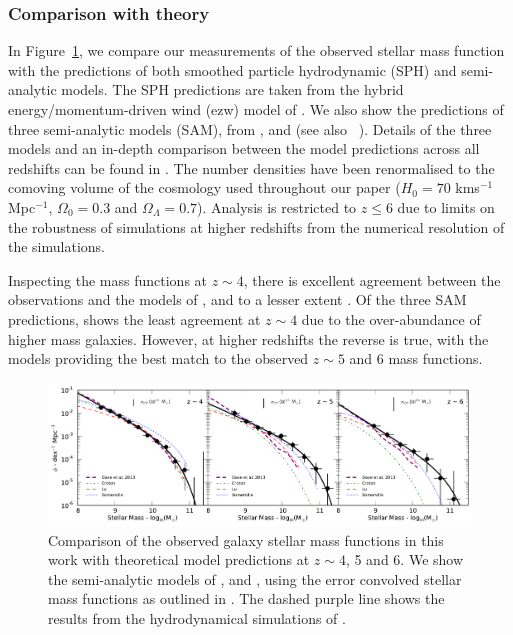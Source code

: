 \subsubsection{Comparison with theory}\label{sec:theory}
In Figure~\ref{fig:smf_theory}, we compare our measurements of the observed stellar mass function with the predictions of both smoothed particle hydrodynamic (SPH) and semi-analytic models. The SPH predictions are taken from the hybrid energy/momentum-driven wind (ezw) model of \citet{Dave:2013bf}. We also show the predictions of three semi-analytic models (SAM), from \citet{Croton:2006ew}, \citet{Lu:2011hj} and \citet{Somerville:2008ed} (see also \citeauthor{Somerville:2012cq}~\citeyear{Somerville:2012cq}). Details of the three models and an in-depth comparison between the model predictions across all redshifts can be found in \citet{Lu:2013ui}. The number densities have been renormalised to the comoving volume of the cosmology used throughout our paper ($H_{0} = 70$ kms$^{-1}$Mpc$^{-1}$, $\Omega_{0}=0.3$ and $\Omega_{\Lambda}=0.7$). Analysis is restricted to $z \leq 6$ due to limits on the robustness of simulations at higher redshifts from the numerical resolution of the simulations.

Inspecting the mass functions at $z \sim 4$, there is excellent agreement between the observations and the models of \citet{Dave:2013bf}, \citet{Croton:2006ew} and to a lesser extent \citet{Lu:2011hj}. Of the three SAM predictions, \citet{Somerville:2008ed} shows the least agreement at $z\sim 4$ due to the over-abundance of higher mass galaxies. However, at higher redshifts the reverse is true, with the \citet{Somerville:2008ed} models providing the best match to the observed $z\sim5$ and 6 mass functions.

\begin{figure}
\centering
\includegraphics[width=\textwidth]{plots/fig11.pdf}
\caption[Short caption]{Comparison of the observed galaxy stellar mass functions in this work with theoretical model predictions at $z \sim 4$, 5 and 6. We show the semi-analytic models of \citet{Croton:2006ew}, \citet{Somerville:2008ed} and \citet{Lu:2011hj}, using the error convolved stellar mass functions as outlined in \citet{Lu:2013ui}. The dashed purple line shows the results from the hydrodynamical simulations of \citet{Dave:2013bf}.}
\label{fig:smf_theory}
\end{figure}

